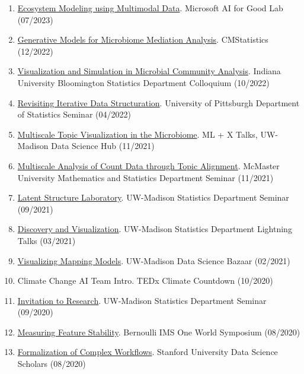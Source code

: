 \documentclass[letterpaper]{article}
\begin{document}
\begin{enumerate}
  \item \href{https://krisrs1128.github.io/talks/2023/20230705/20230705.html}{Ecosystem Modeling using Multimodal Data}. Microsoft AI for Good Lab (07/2023)
  \item \href{https://krisrs1128.github.io/talks/2022/20221217/20221217.html}{Generative Models for Microbiome Mediation Analysis}. CMStatistics (12/2022)
  \item \href{https://krisrs1128.github.io/talks/2022/20221021/20221021.html}{Visualization and Simulation in Microbial Community Analysis}. Indiana University Bloomington Statistics Department Colloquium (10/2022)
  \item \href{https://drive.google.com/file/d/1ju9f8e8aRb5OYLE28Ub0Pc6i2KCpcjgN/view?usp=sharing}{Revisiting Iterative Data Structuration}. University of Pittsburgh Department of Statistics Seminar (04/2022)
  \item \href{https://drive.google.com/file/d/14Lwhvd28sGEMSpw3AXZUsg8XXL25Gr4J/view?usp=sharing}{Multiscale Topic Visualization in the Microbiome}. ML + X Talks, UW-Madison Data Science Hub (11/2021)
  \item \href{https://drive.google.com/file/d/1vcs_aLp6gZFixenGscrj6C5koEltxvGa/view?usp=sharing}{Multiscale Analysis of Count Data through Topic Alignment}. McMaster University Mathematics and Statistics Department Seminar (11/2021)
  \item \href{https://drive.google.com/file/d/1xwYyGc1bx7W-F5QyQlB3OJZT7MVTpdYd/view?usp=sharing}{Latent Structure Laboratory}. UW-Madison Statistics Department Seminar (09/2021)
  \item \href{https://drive.google.com/drive/folders/16P8ZeKM1IEZFgCHgSxakUymamMZkNkTl}{Discovery and Visualization}. UW-Madison Statistics Department Lightning Talks (03/2021)
  \item \href{https://krisrs1128.github.io/mapping-vis/}{Visualizing Mapping Models}. UW-Madison Data Science Bazaar (02/2021)
  \item Climate Change AI Team Intro. TEDx Climate Countdown (10/2020)
  \item \href{https://drive.google.com/file/d/1xwYyGc1bx7W-F5QyQlB3OJZT7MVTpdYd/view?usp=sharing}{Invitation to Research}. UW-Madison Statistics Department Seminar (09/2020)
  \item \href{https://www.youtube.com/watch?v=0W84gxCm83A}{Measuring Feature Stability}. Bernoulli IMS One World Symposium (08/2020)
  \item \href{https://drive.google.com/file/d/1mSRbA96aTuiIHSUmgfZKV788seF3X7p_/view?usp=sharing}{Formalization of Complex Workflows}. Stanford University Data Science Scholars (08/2020)

\end{enumerate}
\end{document}
